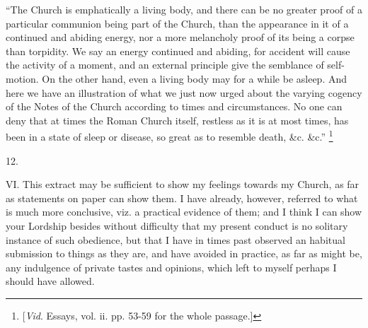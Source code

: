 ``The
Church is emphatically a living body, and there can be no greater
proof of a particular communion being part of the Church, than the
appearance in it of a continued and abiding energy, nor a more
melancholy proof of its being a corpse than torpidity. We say an
energy continued and abiding, for accident will cause the activity of
a moment, and an external principle give the semblance of self-motion.
On the other hand, even a living body may for a while be asleep. And
here we have an illustration of what we just now urged about the
varying cogency of the Notes of the Church according to times and
circumstances. No one can deny that at times the Roman Church itself,
restless as it is at most times, has been in a state of sleep or
disease, so great as to resemble death, \&c. \&c.'' \footnote{[\emph{Vid}. Essays, vol. ii. pp. 53-59 for the whole passage.]}

12.

VI.
This extract may be sufficient to show my feelings towards my Church,
as far as statements on paper can show them. I have already, however,
referred to what is much more conclusive, viz. a practical evidence of
them; and I think I can show your Lordship besides without difficulty
that my present conduct is no solitary instance of such obedience, but
that I have in times past observed an habitual submission to things as
they are, and have avoided in practice, as far as might be, any
indulgence of private tastes and opinions, which left to myself
perhaps I should have allowed.

